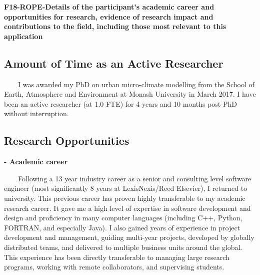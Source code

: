 \noindent \textbf{F18-ROPE-Details of the participant's academic career and opportunities for research, evidence of research impact and contributions to the field, including those most relevant to this application }\\ \noindent 





\subsection*{\TitleFont Amount of Time as an Active Researcher}

~~~~I was awarded my PhD on urban micro-climate modelling from the School of Earth, Atmosphere and Environment at Monash University in March 2017. I have been an active researcher (at 1.0 FTE) for 4 years and 10 months post-PhD without interruption.

\subsection*{\TitleFont Research Opportunities}


\textbf{- Academic career}

~~~~Following a 13 year industry career as a senior and consulting level software engineer (most significantly 8 years at LexisNexis/Reed Elsevier), I returned to university. This previous career has proven highly transferable to my academic research career. It gave me a high level of expertise in software development and design and proficiency in many computer languages (including C++, Python, FORTRAN, and especially Java). I also gained years of experience in project development and management, guiding multi-year projects, developed by globally distributed teams, and delivered to multiple business units around the global. This experience has been directly transferable to managing large research programs, working with remote collaborators, and supervising students.

